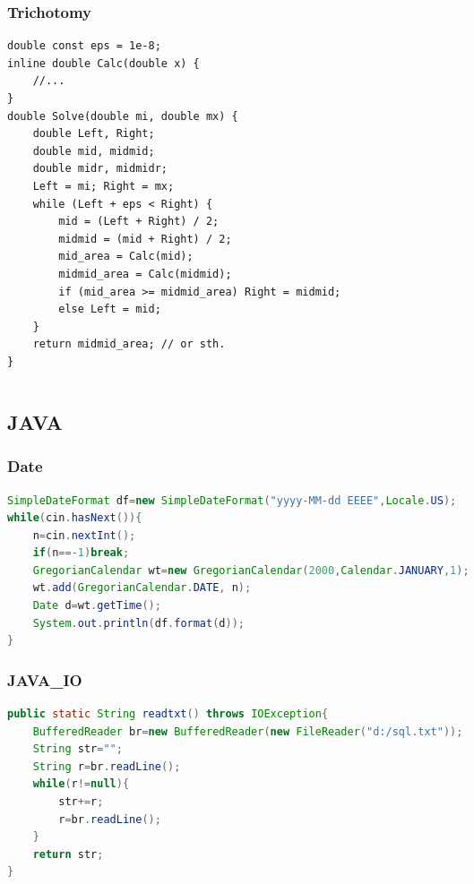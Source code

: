 \documentclass[a4paper]{article}
\begin{document}
\begin{CJK*}{UTF8}{gbsn}
\begin{multicols}{3}
\begin{flushleft}
\subsubsection{Trichotomy}
\begin{lstlisting}
double const eps = 1e-8;
inline double Calc(double x) {
    //...
}
double Solve(double mi, double mx) {
    double Left, Right;
    double mid, midmid;
    double midr, midmidr;
    Left = mi; Right = mx;
    while (Left + eps < Right) {
        mid = (Left + Right) / 2;
        midmid = (mid + Right) / 2;
        mid_area = Calc(mid);
        midmid_area = Calc(midmid);
        if (mid_area >= midmid_area) Right = midmid;
        else Left = mid;
    }
    return midmid_area; // or sth.
}
\end{lstlisting}

\begin{lstlisting}
\end{lstlisting}



\subsection{JAVA}

\subsubsection{Date}
\begin{lstlisting}[language={Java}]
SimpleDateFormat df=new SimpleDateFormat("yyyy-MM-dd EEEE",Locale.US);
while(cin.hasNext()){
    n=cin.nextInt();
    if(n==-1)break;
    GregorianCalendar wt=new GregorianCalendar(2000,Calendar.JANUARY,1);
    wt.add(GregorianCalendar.DATE, n);
    Date d=wt.getTime();
    System.out.println(df.format(d));
}
\end{lstlisting}

\subsubsection{JAVA\_IO}
\begin{lstlisting}[language={Java}]
public static String readtxt() throws IOException{
    BufferedReader br=new BufferedReader(new FileReader("d:/sql.txt"));
    String str="";
    String r=br.readLine();
    while(r!=null){
        str+=r;
        r=br.readLine();
    }
    return str;
}
\end{lstlisting}



\end{flushleft}
\end{multicols}
\end{CJK*}
\end{document}
